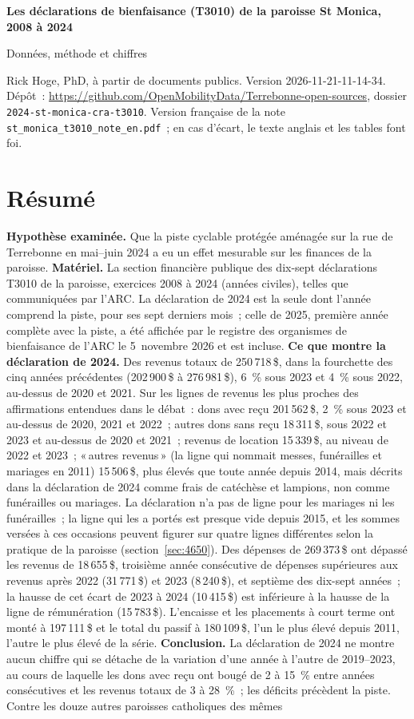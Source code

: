 \documentclass[11pt,letterpaper]{article}
\newcommand{\docversion}{2026-11-21-11-14-34} %
\newcommand{\repourl}{https://github.com/OpenMobilityData/Terrebonne-open-sources}
\newcommand{\folder}{2024-st-monica-cra-t3010}
\newcommand{\D}[1]{#1\,\$}
\begin{document}
{\LARGE\bfseries Les déclarations de bienfaisance (T3010) de la paroisse St Monica, 2008 à 2024}\par\medskip
{\large Données, méthode et chiffres}\par\medskip
{\small Rick Hoge, PhD, à partir de documents publics. Version \docversion. Dépôt~: \href{\repourl}{\repourl}, dossier \texttt{\folder}. Version française de la note \texttt{st\_monica\_t3010\_note\_en.pdf}~; en cas d'écart, le texte anglais et les tables font foi.}

\section*{Résumé}

\textbf{Hypothèse examinée.} Que la piste cyclable protégée aménagée sur la rue de Terrebonne en mai--juin 2024 a eu un effet mesurable sur les finances de la paroisse. \textbf{Matériel.} La section financière publique des dix-sept déclarations T3010 de la paroisse, exercices 2008 à 2024 (années civiles), telles que communiquées par l'ARC. La déclaration de 2024 est la seule dont l'année comprend la piste, pour ses sept derniers mois~; celle de 2025, première année complète avec la piste, a été affichée par le registre des organismes de bienfaisance de l'ARC le 5~novembre 2026 et est incluse. \textbf{Ce que montre la déclaration de 2024.} Des revenus totaux de \D{250\,718}, dans la fourchette des cinq années précédentes (\D{202\,900} à \D{276\,981}), 6~\% sous 2023 et 4~\% sous 2022, au-dessus de 2020 et 2021. Sur les lignes de revenus les plus proches des affirmations entendues dans le débat~: dons avec reçu \D{201\,562}, 2~\% sous 2023 et au-dessus de 2020, 2021 et 2022~; autres dons sans reçu \D{18\,311}, sous 2022 et 2023 et au-dessus de 2020 et 2021~; revenus de location \D{15\,339}, au niveau de 2022 et 2023~; «\,autres revenus\,» (la ligne qui nommait messes, funérailles et mariages en 2011) \D{15\,506}, plus élevés que toute année depuis 2014, mais décrits dans la déclaration de 2024 comme frais de catéchèse et lampions, non comme funérailles ou mariages. La déclaration n'a pas de ligne pour les mariages ni les funérailles~; la ligne qui les a portés est presque vide depuis 2015, et les sommes versées à ces occasions peuvent figurer sur quatre lignes différentes selon la pratique de la paroisse (section~\ref{sec:4650}). Des dépenses de \D{269\,373} ont dépassé les revenus de \D{18\,655}, troisième année consécutive de dépenses supérieures aux revenus après 2022 (\D{31\,771}) et 2023 (\D{8\,240}), et septième des dix-sept années~; la hausse de cet écart de 2023 à 2024 (\D{10\,415}) est inférieure à la hausse de la ligne de rémunération (\D{15\,783}). L'encaisse et les placements à court terme ont monté à \D{197\,111} et le total du passif à \D{180\,109}, l'un le plus élevé depuis 2011, l'autre le plus élevé de la série. \textbf{Conclusion.} La déclaration de 2024 ne montre aucun chiffre qui se détache de la variation d'une année à l'autre de 2019--2023, au cours de laquelle les dons avec reçu ont bougé de 2 à 15~\% entre années consécutives et les revenus totaux de 3 à 28~\%~; les déficits précèdent la piste. Contre les douze autres paroisses catholiques des mêmes 
\end{document}
